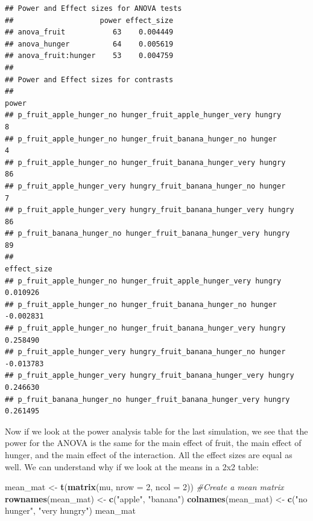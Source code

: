 \documentclass[]{book}
\newenvironment{Shaded}{\begin{snugshade}}{\end{snugshade}}
\newcommand{\CommentTok}[1]{\textcolor[rgb]{0.56,0.35,0.01}{\textit{#1}}}
\newcommand{\DataTypeTok}[1]{\textcolor[rgb]{0.13,0.29,0.53}{#1}}
\newcommand{\DecValTok}[1]{\textcolor[rgb]{0.00,0.00,0.81}{#1}}
\newcommand{\KeywordTok}[1]{\textcolor[rgb]{0.13,0.29,0.53}{\textbf{#1}}}
\newcommand{\NormalTok}[1]{#1}
\newcommand{\StringTok}[1]{\textcolor[rgb]{0.31,0.60,0.02}{#1}}
\begin{document}
\begin{verbatim}
## Power and Effect sizes for ANOVA tests
##                    power effect_size
## anova_fruit           63    0.004449
## anova_hunger          64    0.005619
## anova_fruit:hunger    53    0.004759
## 
## Power and Effect sizes for contrasts
##                                                                  power
## p_fruit_apple_hunger_no hunger_fruit_apple_hunger_very hungry        8
## p_fruit_apple_hunger_no hunger_fruit_banana_hunger_no hunger         4
## p_fruit_apple_hunger_no hunger_fruit_banana_hunger_very hungry      86
## p_fruit_apple_hunger_very hungry_fruit_banana_hunger_no hunger       7
## p_fruit_apple_hunger_very hungry_fruit_banana_hunger_very hungry    86
## p_fruit_banana_hunger_no hunger_fruit_banana_hunger_very hungry     89
##                                                                  effect_size
## p_fruit_apple_hunger_no hunger_fruit_apple_hunger_very hungry       0.010926
## p_fruit_apple_hunger_no hunger_fruit_banana_hunger_no hunger       -0.002831
## p_fruit_apple_hunger_no hunger_fruit_banana_hunger_very hungry      0.258490
## p_fruit_apple_hunger_very hungry_fruit_banana_hunger_no hunger     -0.013783
## p_fruit_apple_hunger_very hungry_fruit_banana_hunger_very hungry    0.246630
## p_fruit_banana_hunger_no hunger_fruit_banana_hunger_very hungry     0.261495
\end{verbatim}

Now if we look at the power analysis table for the last simulation, we see that the power for the ANOVA is the same for the main effect of fruit, the main effect of hunger, and the main effect of the interaction. All the effect sizes are equal as well. We can understand why if we look at the means in a 2x2 table:

\begin{Shaded}
\begin{Highlighting}[]
\NormalTok{mean_mat <-}\StringTok{ }\KeywordTok{t}\NormalTok{(}\KeywordTok{matrix}\NormalTok{(mu, }
                     \DataTypeTok{nrow =} \DecValTok{2}\NormalTok{,}
                     \DataTypeTok{ncol =} \DecValTok{2}\NormalTok{)) }\CommentTok{#Create a mean matrix}
\KeywordTok{rownames}\NormalTok{(mean_mat) <-}\StringTok{ }\KeywordTok{c}\NormalTok{(}\StringTok{"apple"}\NormalTok{, }\StringTok{"banana"}\NormalTok{)}
\KeywordTok{colnames}\NormalTok{(mean_mat) <-}\StringTok{ }\KeywordTok{c}\NormalTok{(}\StringTok{"no hunger"}\NormalTok{, }\StringTok{"very hungry"}\NormalTok{)}
\NormalTok{mean_mat}
\end{Highlighting}
\end{Shaded}
\end{document}
